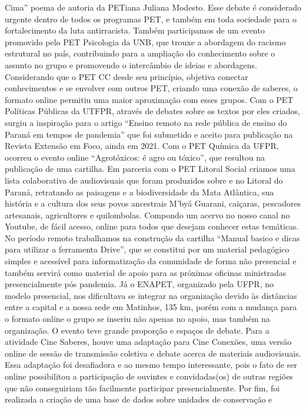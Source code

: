 Cima” poema de autoria da PETiana Juliana Modesto. Esse debate é considerado urgente dentro
de todos os programas PET, e também em toda sociedade para o fortalecimento da luta
antirracista. Também participamos de um evento promovido pelo PET Psicologia da UNB, que
trouxe a abordagem do racismo estrutural no país, contribuindo para a ampliação do
conhecimento sobre o assunto no grupo e promovendo o intercâmbio de ideias e abordagens.
Considerando que o PET CC desde seu princípio, objetiva conectar conhecimentos e se
envolver com outros PET, criando uma conexão de saberes, o formato online permitiu uma maior
aproximação com esses grupos. Com o PET Políticas Públicas da UTFPR, através de debates
sobre os textos por eles criados, surgiu a inspiração para o artigo “Ensino remoto na rede pública
de ensino do Paraná em tempos de pandemia” que foi submetido e aceito para publicação na
Revista Extensão em Foco, ainda em 2021. Com o PET Química da UFPR, ocorreu o evento
online “Agrotóxicos: é agro ou tóxico”, que resultou na publicação de uma cartilha. Em parceria
com o PET Litoral Social criamos uma lista colaborativa de audiovisuais que foram produzidos
sobre e no Litoral do Paraná, retratando as paisagens e a biodiversidade da Mata Atlântica, sua
história e a cultura dos seus povos ancestrais M’byá Guarani, caiçaras, pescadores artesanais,
agricultores e quilombolas. Compondo um acervo no nosso canal no Youtube, de fácil acesso,
online para todos que desejam conhecer estas temáticas.
No período remoto trabalhamos na construção da cartilha “Manual basico e dicas para
utilizar a ferramenta Drive”, que se constitui por um material pedagógico simples e acessível
para informatização da comunidade de forma não presencial e também servirá como material de
apoio para as próximas oficinas ministradas presencialmente pós pandemia. Já o ENAPET,
organizado pela UFPR, no modelo presencial, nos dificultava se integrar na organização devido
às distâncias entre a capital e a nossa sede em Matinhos, 135 km, porém com a mudança para o
formato online o grupo se inseriu não apenas no apoio, mas também na organização. O evento
teve grande proporção e espaços de debate.
Para a atividade Cine Saberes, houve uma adaptação para Cine Conexões, uma versão
online de sessão de transmissão coletiva e debate acerca de materiais audiovisuais. Essa
adaptação foi desafiadora e ao mesmo tempo interessante, pois o fato de ser online possibilitou a
participação de ouvintes e convidadas(os) de outras regiões que não conseguiriam tão facilmente
participar presencialmente.
Por fim, foi realizada a criação de uma base de dados sobre unidades de conservação e
